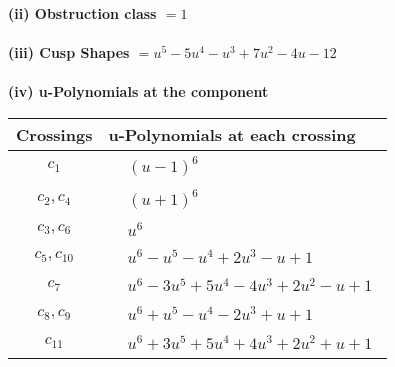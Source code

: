 \documentclass[1p]{elsarticle_modified}
\theoremstyle{definition}
\begin{document}
\flushleft \textbf{(ii) Obstruction class $= 1$}\\~\\
\flushleft \textbf{(iii) Cusp Shapes $= u^5-5 u^4- u^3+7 u^2-4 u-12$}\\~\\
\newpage\renewcommand{\arraystretch}{1}
\flushleft \textbf{(iv) u-Polynomials at the component}\newline \\
\begin{tabular}{m{50pt}|m{274pt}}
Crossings & \hspace{64pt}u-Polynomials at each crossing \\
\hline $$\begin{aligned}c_{1}\end{aligned}$$&$\begin{aligned}
&(u-1)^6
\end{aligned}$\\
\hline $$\begin{aligned}c_{2},c_{4}\end{aligned}$$&$\begin{aligned}
&(u+1)^6
\end{aligned}$\\
\hline $$\begin{aligned}c_{3},c_{6}\end{aligned}$$&$\begin{aligned}
&u^6
\end{aligned}$\\
\hline $$\begin{aligned}c_{5},c_{10}\end{aligned}$$&$\begin{aligned}
&u^6- u^5- u^4+2 u^3- u+1
\end{aligned}$\\
\hline $$\begin{aligned}c_{7}\end{aligned}$$&$\begin{aligned}
&u^6-3 u^5+5 u^4-4 u^3+2 u^2- u+1
\end{aligned}$\\
\hline $$\begin{aligned}c_{8},c_{9}\end{aligned}$$&$\begin{aligned}
&u^6+u^5- u^4-2 u^3+u+1
\end{aligned}$\\
\hline $$\begin{aligned}c_{11}\end{aligned}$$&$\begin{aligned}
&u^6+3 u^5+5 u^4+4 u^3+2 u^2+u+1
\end{aligned}$\\
\hline
\end{tabular}\\~\\
\end{document}
